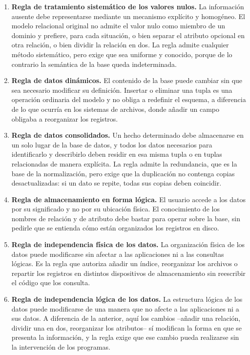 \begin{enumerate}[leftmargin=1.9em,itemsep=0.55em,start=3]
  \item \textbf{Regla de tratamiento sistemático de los valores nulos.} La
    información ausente debe representarse mediante un mecanismo explícito y
    homogéneo. El modelo relacional original no admite el valor nulo como
    miembro de un dominio y prefiere, para cada situación, o bien separar el
    atributo opcional en otra relación, o bien dividir la relación en dos. La
    regla admite cualquier método sistemático, pero exige que sea uniforme y
    conocido, porque de lo contrario la semántica de la base queda
    indeterminada.
  \item \textbf{Regla de datos dinámicos.} El contenido de la base puede
    cambiar sin que sea necesario modificar su definición. Insertar o eliminar
    una tupla es una operación ordinaria del modelo y no obliga a redefinir el
    esquema, a diferencia de lo que ocurría en los sistemas de archivos, donde
    añadir un campo obligaba a reorganizar los registros.
  \item \textbf{Regla de datos consolidados.} Un hecho determinado debe
    almacenarse en un solo lugar de la base de datos, y todos los datos
    necesarios para identificarlo y describirlo deben residir en esa misma
    tupla o en tuplas relacionadas de manera explícita. La regla admite la
    redundancia, que es la base de la normalización, pero exige que la
    duplicación no contenga copias desactualizadas: si un dato se repite,
    todas sus copias deben coincidir.
  \item \textbf{Regla de almacenamiento en forma lógica.} El usuario accede a
    los datos por su significado y no por su ubicación física. El conocimiento
    de los nombres de relación y de atributo debe bastar para operar sobre la
    base, sin pedirle que se entienda cómo están organizados los registros en
    disco.
  \item \textbf{Regla de independencia física de los datos.} La organización
    física de los datos puede modificarse sin afectar a las aplicaciones ni a
    las consultas lógicas. Es la regla que autoriza añadir un índice,
    reorganizar los archivos o repartir los registros en distintos
    dispositivos de almacenamiento sin reescribir el código que los consulta.
  \item \textbf{Regla de independencia lógica de los datos.} La estructura
    lógica de los datos puede modificarse de una manera que no afecte a las
    aplicaciones ni a sus datos. A diferencia de la anterior, aquí los cambios
    --añadir una relación, dividir una en dos, reorganizar los atributos-- sí
    modifican la forma en que se presenta la información, y la regla exige que
    ese cambio pueda realizarse sin la intervención de los programas.
\end{enumerate}


